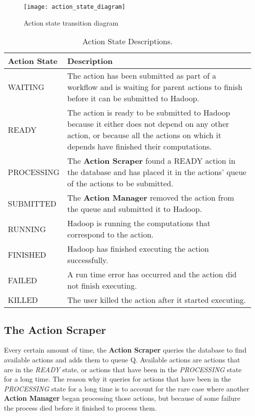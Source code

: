 \begin{figure}
\centering
\texttt{[image: action\_state\_diagram]}
\caption{Action state transition diagram}
\label{fig:action_transition_diagram}
\end{figure}

\begin{table}
\begin{tabular}{| l | p{12cm} |}

\hline
\textbf{Action State} & \textbf{Description} \\ \hline
WAITING & The action has been submitted as part of a workflow and is waiting for parent actions to finish before it can be submitted to Hadoop.\\ \hline
READY & The action is ready to be submitted to Hadoop because it either does not depend on any other action, or because all the actions on which it depends have finished their computations. \\ \hline
PROCESSING & The \textbf{Action Scraper} found a READY action in the database and has placed it in the actions' queue of the actions to be submitted. \\ \hline
SUBMITTED & The \textbf{Action Manager} removed the action from the queue and submitted it to Hadoop. \\ \hline
RUNNING & Hadoop is running the computations that correspond to the action. \\ \hline
FINISHED & Hadoop has finished executing the action successfully.\\ \hline
FAILED & A run time error has occurred and the action did not finish executing.\\ \hline
KILLED & The user killed the action after it started executing.\\ \hline
\end{tabular}
\caption{Action State Descriptions.\label{tab:action_states}}
\end{table}

\subsection{The Action Scraper}
Every certain amount of time, the \textbf{Action Scraper} queries the database to find available actions and adds them to queue Q. Available actions are actions that are in the \textit{READY} state, or actions that have been in the \textit{PROCESSING} state for a long time. The reason why it queries for actions that have been in the \textit{PROCESSING} state for a long time is to account for the rare case where another \textbf{Action Manager} began processing those actions, but because of some failure the process died before it finished to process them.

